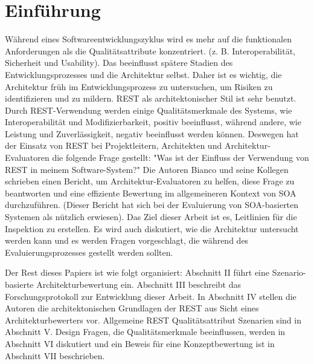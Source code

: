 \documentclass{acmsiggraph}
\begin{document}
\section{Einführung}
Während eines Softwareentwicklungszyklus wird es mehr auf die funktionalen Anforderungen als die Qualitätsattribute konzentriert. (z. B. Interoperabilität, Sicherheit und Usability).
Das beeinflusst spätere Stadien des Entwicklungsprozesses und die Architektur selbst.
Daher ist es wichtig, die Architektur früh im Entwicklungsprozess zu untersuchen, um Risiken zu identifizieren und zu mildern.
REST als architektonischer Stil ist sehr benutzt.
Durch REST-Verwendung werden einige Qualitätsmerkmale des Systems, wie Interoperabilität und Modifizierbarkeit, positiv beeinflusst, während andere, wie Leistung und Zuverlässigkeit, negativ beeinflusst werden können.
Deswegen hat der Einsatz von REST bei Projektleitern, Architekten und Architektur-Evaluatoren die folgende Frage gestellt: "Was ist der Einfluss der Verwendung von REST in meinem Software-System?"
Die Autoren Bianco und seine Kollegen \cite{3} schrieben einen Bericht, um Architektur-Evaluatoren zu helfen, diese Frage zu beantworten und eine effiziente Bewertung im allgemeineren Kontext von SOA \cite{wiki} durchzuführen. (Dieser Bericht hat sich bei der Evaluierung von SOA-basierten Systemen als nützlich erwiesen).
Das Ziel dieser Arbeit ist es, Leitlinien für die Inspektion zu erstellen. Es wird auch diskutiert, wie die Architektur untersucht werden kann und es werden Fragen vorgeschlagt, die während des Evaluierungsprozesses gestellt werden sollten.

Der Rest dieses Papiers ist wie folgt organisiert: Abschnitt II führt eine Szenario-basierte Architekturbewertung ein. Abschnitt III beschreibt das Forschungsprotokoll zur Entwicklung dieser Arbeit. In Abschnitt IV stellen die Autoren die architektonischen Grundlagen der REST aus Sicht eines Architekturbewerters vor. Allgemeine REST Qualitätsattribut Szenarien sind in Abschnitt V. Design Fragen, die Qualitätsmerkmale beeinflussen, werden in Abschnitt VI diskutiert und ein Beweis für eine Konzeptbewertung ist in Abschnitt VII beschrieben.

\iffalse
\end{document}

